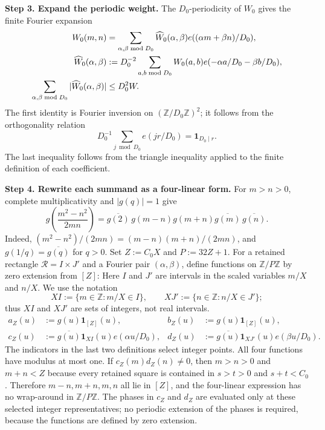 \documentclass[twoside]{aomart}
\makeatletter
\theoremstyle{paperplain}
\theoremstyle{paperdefinition}
\renewenvironment{proof}[1][\proofname]{\par\pushQED{\qed}%
  \normalfont\topsep6\p@\@plus3\p@\relax\trivlist
  \item[\hskip\labelsep\itshape #1\@addpunct{.}]\ignorespaces
}{\popQED\endtrivlist\@endpefalse}
\numberwithin{equation}{section}
\makeatother
\begin{document}
\begin{proof}
\par
\medskip
\noindent\textbf{Step 3. Expand the periodic weight.}
The $D_0$-periodicity of $W_0$ gives the finite Fourier expansion
\begin{align*}
 W_0(m,n)&=\sum_{\alpha,\beta\bmod D_0}
       \widehat W_0(\alpha,\beta)
       e((\alpha m+\beta n)/D_0),\notag\\
 \widehat W_0(\alpha,\beta)&:=D_0^{-2}\sum_{a,b\bmod D_0}
       W_0(a,b)e(-\alpha a/D_0-\beta b/D_0),\notag\\
 \sum_{\alpha,\beta\bmod D_0}|\widehat W_0(\alpha,\beta)|
       &\le D_0^2W.
\end{align*}
The first identity is Fourier inversion on $(\mathbb Z/D_0\mathbb Z)^2$;
it follows from the orthogonality relation
$$D_0^{-1}\sum_{j\bmod D_0}e(jr/D_0)=\mathbf 1_{D_0\mid r}.$$
The last inequality follows from the triangle inequality applied to the
finite definition of each coefficient.

\par
\medskip
\noindent\textbf{Step 4. Rewrite each summand as a four-linear form.}
For $m>n>0$, complete multiplicativity and $|g(q)|=1$ give
\begin{equation*}
 g\!\left(\frac{m^2-n^2}{2mn}\right)
 =\overline{g(2)}\,g(m-n)g(m+n)\overline{g(m)}\,\overline{g(n)}.
\end{equation*}
Indeed, $(m^2-n^2)/(2mn)=(m-n)(m+n)/(2mn)$, and
$g(1/q)=\overline{g(q)}$ for $q>0$.
Set $Z:=C_0X$ and $P:=32Z+1$.  For a retained rectangle
$\mathcal R=I\times J'$ and a Fourier pair $(\alpha,\beta)$, define
functions on $\mathbb Z/P\mathbb Z$ by zero extension from $[Z]$:
Here $I$ and $J'$ are intervals in the scaled variables $m/X$ and $n/X$.
We use the notation
\[
 XI:=\{m\in\mathbb Z:m/X\in I\},
 \qquad
 XJ':=\{n\in\mathbb Z:n/X\in J'\};
\]
thus $XI$ and $XJ'$ are sets of integers, not real intervals.
\begin{align*}
 a_Z(u)&:=g(u)\mathbf 1_{[Z]}(u),
 &b_Z(u)&:=g(u)\mathbf 1_{[Z]}(u),\\
 c_Z(u)&:=\overline{g(u)}\mathbf 1_{XI}(u)e(\alpha u/D_0),
 &d_Z(u)&:=\overline{g(u)}\mathbf 1_{XJ'}(u)e(\beta u/D_0).
\end{align*}
The indicators in the last two definitions select integer points.  All four
functions have modulus at most one.  If $c_Z(m)d_Z(n)\ne0$, then
$m>n>0$ and $m+n<Z$ because every retained square is contained in
$s>t>0$ and $s+t<C_0$.  Therefore
$m-n,m+n,m,n$ all lie in $[Z]$, and the four-linear expression has no
wrap-around in $\mathbb Z/P\mathbb Z$.  The phases in $c_Z$ and $d_Z$ are
evaluated only at these selected integer representatives; no periodic
extension of the phases is required, because the functions are defined by
zero extension.


\end{proof}
\end{document}
